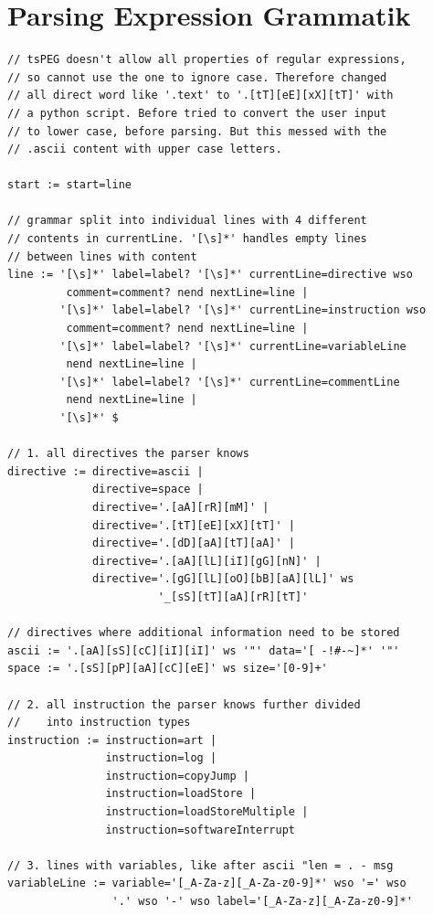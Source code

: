 \documentclass[a4paper, 11pt, onecolumn]{article}
\begin{document}
\section{Parsing Expression Grammatik}\label{app:peg}
\begin{lstlisting}[basicstyle=\ttfamily\footnotesize, caption={[Vollständige Grammatik]}]
// tsPEG doesn't allow all properties of regular expressions,
// so cannot use the one to ignore case. Therefore changed
// all direct word like '.text' to '.[tT][eE][xX][tT]' with
// a python script. Before tried to convert the user input
// to lower case, before parsing. But this messed with the
// .ascii content with upper case letters.

start := start=line

// grammar split into individual lines with 4 different
// contents in currentLine. '[\s]*' handles empty lines
// between lines with content
line := '[\s]*' label=label? '[\s]*' currentLine=directive wso
         comment=comment? nend nextLine=line |
        '[\s]*' label=label? '[\s]*' currentLine=instruction wso
         comment=comment? nend nextLine=line |
        '[\s]*' label=label? '[\s]*' currentLine=variableLine
         nend nextLine=line |
        '[\s]*' label=label? '[\s]*' currentLine=commentLine
         nend nextLine=line |
        '[\s]*' $

// 1. all directives the parser knows
directive := directive=ascii |
             directive=space |
             directive='.[aA][rR][mM]' |
             directive='.[tT][eE][xX][tT]' |
             directive='.[dD][aA][tT][aA]' |
             directive='.[aA][lL][iI][gG][nN]' |
             directive='.[gG][lL][oO][bB][aA][lL]' ws
                       '_[sS][tT][aA][rR][tT]'

// directives where additional information need to be stored
ascii := '.[aA][sS][cC][iI][iI]' ws '"' data='[ -!#-~]*' '"'
space := '.[sS][pP][aA][cC][eE]' ws size='[0-9]+'

// 2. all instruction the parser knows further divided
//    into instruction types
instruction := instruction=art |
               instruction=log |
               instruction=copyJump |
               instruction=loadStore |
               instruction=loadStoreMultiple |
               instruction=softwareInterrupt

// 3. lines with variables, like after ascii "len = . - msg
variableLine := variable='[_A-Za-z][_A-Za-z0-9]*' wso '=' wso
                '.' wso '-' wso label='[_A-Za-z][_A-Za-z0-9]*'


\end{lstlisting}
\end{document}
